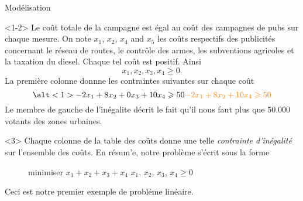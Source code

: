 \documentclass[aspectratio = 169]{beamer}
\begin{document}
\begin{frame}{Mod\'elisation}
  \begin{onlyenv}<1-2>
    Le co\^ut totale de la campagne est \'egal au co\^ut des campagnes
    de pubs sur chaque mesure.  On note $x_1$, $x_2$, $x_4$ and $x_5$
    les co\^uts respectifs des publicit\'es concernant le r\'eseau de
    routes, le contr\^ole des armes, les subventions agricoles et la
    taxation du diesel. Chaque tel co\^ut est positif. Ainsi
    \begin{equation}
      \label{eq:positivityCondition}
      x_1, x_2, x_3, x_4 \geqslant 0.
    \end{equation}
    La premi\`ere colonne donnne les contraintes suivantes sur chaque co\^ut
    \begin{equation}
      \alt<1>{-2x_1 + 8x_2 + 0x_3 + 10x_4 \geqslant 50}{\textcolor{orange}{-2x_1 + 8x_2 + 10x_4 \geqslant 50}}
    \end{equation}
    Le membre de gauche de l'in\'egalite d\'ecrit le fait qu'il nous
    faut plus que 50.000 votants des zones urbaines.
  \end{onlyenv}
  \begin{onlyenv}<3>
    Chaque colonne de la table des co\^uts donne une telle
    \emph{contrainte d'in\'egalit\'e} sur l'ensemble des co\^uts. En
    r\'esum'e, notre probl\`eme s'\'ecrit sous la forme
    \begin{figure}
      \begin{linearProg}{
          minimiser
        }{
          $x_1+x_2+x_3+x_4$
        }{
        }{
          $x_1$, $x_2$, $x_3$, $x_4 \geq 0$
        }
      \end{linearProg}
    \end{figure}
    Ceci est notre premier exemple de probl\'eme lin\'eaire.
    \end{onlyenv}
\end{frame}
\end{document}
